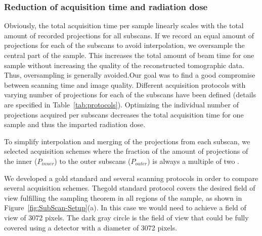 \subsubsection{Reduction of acquisition time and radiation dose}
\label{subsubsec:reduction-of-acquisition-time}
\cbstart Obviously, the total acquisition time per sample linearly scales with the total amount of recorded projections for all subscans. If we record an equal amount of projections for each of the subscans to avoid interpolation, we oversample the central part of the sample. This increases the total amount of beam time for one sample without increasing the quality of the reconstructed tomographic data. Thus, oversampling is generally avoided.\cbend Our goal was to find a good compromise between scanning time and image quality.
\cbstart 
Different acquisition protocols with varying number of projections for each of the subscans have been defined (details are specified in Table~\ref{tab:protocols}). Optimizing the individual number of projections acquired per subscans decreases the total acquisition time for one sample and thus the imparted radiation dose.
\cbend

To simplify interpolation and merging of the projections from each subscan, we selected acquisition schemes where the fraction of the amount of projections of the inner ($P_{inner}$) to the outer subscans ($P_{outer}$) is always a multiple of two%
.\cbdelete%

\cbstart We developed a gold standard and several scanning protocols in order to compare several acquisition schemes. The\cbend gold standard protocol covers the desired field of view fulfilling the sampling theorem in all regions of the sample, as shown in Figure~\ref{fig:SubScan-Setup}(a).\cbdelete%
\cbstart In this case we would need to achieve a field of view of 3072 pixels. The dark gray circle is the field of view that could be fully covered using a detector with a diameter of 3072 pixels.\cbend

